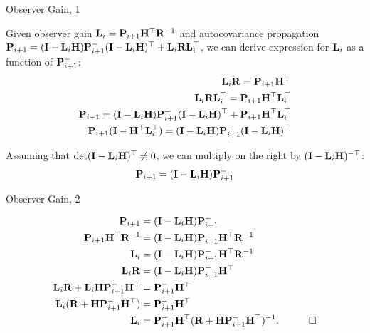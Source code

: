 \documentclass{beamer}
\begin{document}
\begin{frame}{Observer Gain, 1}
	\begin{flushleft}
		
		Given observer gain $\mathbf{L}_i = \mathbf{P}_{i+1} \mathbf{H}^\top \mathbf{R}^{-1}$ and autocovariance propagation $ \mathbf{P}_{i+1} = (\mathbf{I} - \mathbf{L}_i \mathbf{H}) \mathbf{P}_{i+1}^- (\mathbf{I} - \mathbf{L}_i \mathbf{H})^\top +\mathbf{L}_i\mathbf{R}\mathbf{L}_i^\top$, we can derive expression for $\mathbf{L}_i$ as a function of $\mathbf{P}_{i+1}^-$:
		\begin{align}
			\mathbf{L}_i \mathbf{R} = \mathbf{P}_{i+1} \mathbf{H}^\top 
			\\
			\mathbf{L}_i \mathbf{R}\mathbf{L}_i^\top = \mathbf{P}_{i+1} \mathbf{H}^\top \mathbf{L}_i^\top
			\\
			\mathbf{P}_{i+1} = (\mathbf{I} - \mathbf{L}_i \mathbf{H}) \mathbf{P}_{i+1}^- (\mathbf{I} - \mathbf{L}_i \mathbf{H})^\top +\mathbf{P}_{i+1} \mathbf{H}^\top \mathbf{L}_i^\top
			\\
			\mathbf{P}_{i+1}(\mathbf{I}- \mathbf{H}^\top \mathbf{L}_i^\top) = (\mathbf{I} - \mathbf{L}_i \mathbf{H}) \mathbf{P}_{i+1}^- (\mathbf{I} - \mathbf{L}_i \mathbf{H})^\top
		\end{align}
		
		Assuming that $\text{det}(\mathbf{I}- \mathbf{L}_i \mathbf{H} )^\top \neq 0$, we can multiply on the right by $(\mathbf{I}- \mathbf{L}_i \mathbf{H} )^{-\top}$:
		\begin{align}
	\mathbf{P}_{i+1} = (\mathbf{I} - \mathbf{L}_i \mathbf{H}) \mathbf{P}_{i+1}^- 
		\end{align}		
		
	\end{flushleft}
\end{frame}


\begin{frame}{Observer Gain, 2}
	\begin{flushleft}
		
		\begin{align}
			\mathbf{P}_{i+1} &= (\mathbf{I} - \mathbf{L}_i \mathbf{H}) \mathbf{P}_{i+1}^- 
			\\
			\mathbf{P}_{i+1}\mathbf{H}^\top\mathbf{R}^{-1} &= (\mathbf{I} - \mathbf{L}_i \mathbf{H}) \mathbf{P}_{i+1}^- \mathbf{H}^\top\mathbf{R}^{-1}
			\\
			\mathbf{L}_i &= (\mathbf{I} - \mathbf{L}_i \mathbf{H}) \mathbf{P}_{i+1}^- \mathbf{H}^\top\mathbf{R}^{-1}
			\\
			\mathbf{L}_i\mathbf{R} &= (\mathbf{I} - \mathbf{L}_i \mathbf{H}) \mathbf{P}_{i+1}^- \mathbf{H}^\top
			\\
			\mathbf{L}_i\mathbf{R} + \mathbf{L}_i \mathbf{H}\mathbf{P}_{i+1}^- \mathbf{H}^\top &= \mathbf{P}_{i+1}^- \mathbf{H}^\top 
			\\
			\mathbf{L}_i (\mathbf{R} + \mathbf{H}\mathbf{P}_{i+1}^- \mathbf{H}^\top) &= \mathbf{P}_{i+1}^- \mathbf{H}^\top 
			\\
			\mathbf{L}_i &= \mathbf{P}_{i+1}^- \mathbf{H}^\top (\mathbf{R} + \mathbf{H}\mathbf{P}_{i+1}^- \mathbf{H}^\top)^{-1}.  \ \ \ \qed
		\end{align}		
		
	\end{flushleft}
\end{frame}
\end{document}
